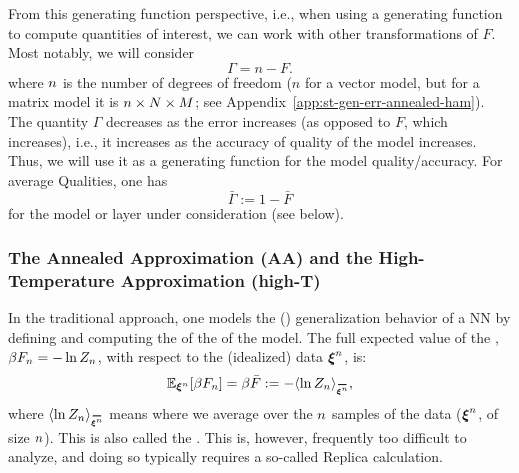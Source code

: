 From this generating function perspective, i.e., when using a generating function to compute quantities of interest, we can work with other transformations of $F$.
Most notably, we will consider 
\begin{equation}
    \Gamma = n-F .
\end{equation}
where $n$ is the number of degrees of freedom ($n$ for a vector model, but for a  matrix model it is $n\times N\times M$; see Appendix~\ref{app:st-gen-err-annealed-ham}).
The quantity $\Gamma$ decreases as the error increases (as opposed to $F$, which increases), i.e., it increases as the accuracy of quality of the model increases.
Thus, we will use it as a generating function for the model quality/accuracy.
For average Qualities, one has
\begin{equation} 
\label{eqn:GammaBar}
 \bar{\Gamma}:=1-\bar{F}
\end{equation} %
for the model or layer under consideration (see below).


\subsubsection{The Annealed Approximation (AA) and the High-Temperature Approximation (high-T)}
\label{sxn:mathP_annealed}

In the traditional \SMOG approach, one models the (\Typical) generalization behavior of a NN
by defining and computing the \ExpectedValue of the \FreeEnergy of the model.
The full expected value  of the \FreeEnergy, $\beta F_{n}=-\ln Z_{n}$, with respect to the (idealized) data $\boldsymbol{\xi}^{n}$, is:
\begin{align}
\label{eqn:mm_f_bar}
  \mathbb{E}_{\NDXIn}[\beta F_{\ND}]=\beta\bar{F}:=-\langle \ln Z_{\ND}\rangle_{\AVGNDXIn},
\end{align}
where $\langle \ln Z_{\ND}\rangle_{\AVGNDXIn}$ means where we average over  the $n$ samples of the data ($\boldsymbol{\xi}^{n}$, of size $n$).  This is also called the \Quenched \FreeEnergy.
This is, however,  frequently too difficult to analyze, and doing so typically
requires a so-called Replica calculation. 

